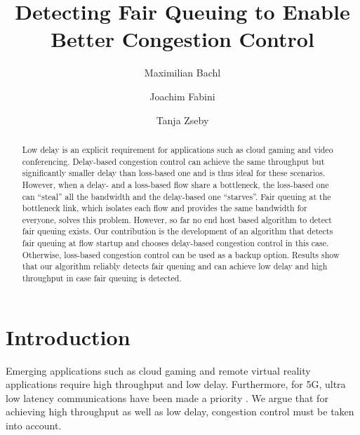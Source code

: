 \documentclass[runningheads]{llncs}
\begin{document}
%
\title{Detecting Fair Queuing to Enable Better Congestion Control}
%
%
\author{Maximilian Bachl \and
Joachim Fabini \and
Tanja Zseby}
%
%
%
\maketitle              %
%
\begin{abstract}
Low delay is an explicit requirement for applications such as cloud gaming and video conferencing. Delay-based congestion control can achieve the same throughput but significantly smaller delay than loss-based one and is thus ideal for these scenarios. However, when a delay- and a loss-based flow share a bottleneck, the loss-based one can ``steal'' all the bandwidth and the delay-based one ``starves''. Fair queuing at the bottleneck link, which isolates each flow and provides the same bandwidth for everyone, solves this problem. However, so far no end host based algorithm to detect fair queuing exists. Our contribution is the development of an algorithm that detects fair queuing at flow startup and chooses delay-based congestion control in this case. Otherwise, loss-based congestion control can be used as a backup option. Results show that our algorithm reliably detects fair queuing and can achieve low delay and high throughput in case fair queuing is detected. 

\end{abstract}
%
%
%
\section{Introduction}
\label{sec:introduction}

Emerging applications such as cloud gaming \cite{jarschel_evaluation_2011} and remote virtual reality \cite{elbamby_toward_2018} applications require high throughput and low delay. Furthermore, for 5G, ultra low latency communications have been made a priority \cite{li_5g_2018}. We argue that for achieving high throughput as well as low delay, congestion control must be taken into account. 
\end{document}
